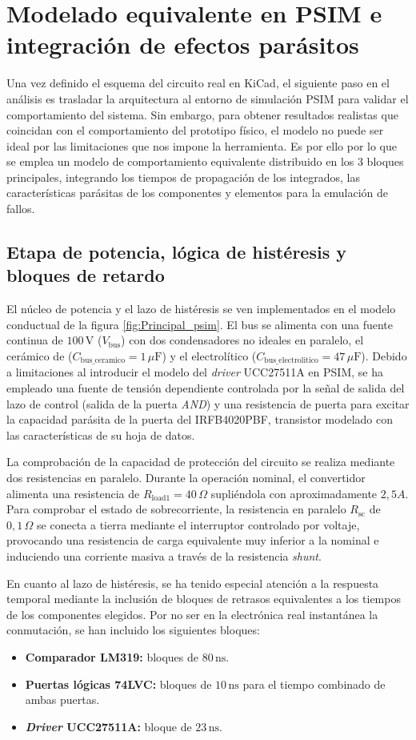 \documentclass[12pt]{report} %
\begin{document}
\section{Modelado equivalente en PSIM e integración de efectos parásitos}
Una vez definido el esquema del circuito real en KiCad, el siguiente paso en el análisis es trasladar la arquitectura al entorno de simulación PSIM para validar el comportamiento del sistema. Sin embargo, para obtener resultados realistas que coincidan con el comportamiento del prototipo físico, el modelo no puede ser ideal por las limitaciones que nos impone la herramienta. Es por ello por lo que se emplea un modelo de comportamiento equivalente distribuido en los 3 bloques principales, integrando los tiempos de propagación de los integrados, las características parásitas de los componentes y elementos para la emulación de fallos. 

\subsection{Etapa de potencia, lógica de histéresis y bloques de retardo}
El núcleo de potencia y el lazo de histéresis se ven implementados en el modelo conductual de la figura \ref{fig:Principal_psim}. El bus se alimenta con una fuente continua de $100\,\text{V}$ ($V_\text{bus}$) con dos condensadores no ideales en paralelo, el cerámico de ($C_\text{bus\_ceramico} = 1\,\mu\text{F}$) y el electrolítico ($C_\text{bus\_electrolitico} = 47\,\mu\text{F}$). Debido a limitaciones al introducir el modelo del \textit{driver} UCC27511A en PSIM, se ha empleado una fuente de tensión dependiente controlada por la señal de salida del lazo de control (salida de la puerta \textit{AND}) y una resistencia de puerta para excitar la capacidad parásita de la puerta del IRFB4020PBF, transistor modelado con las características de su hoja de datos. 

La comprobación de la capacidad de protección del circuito se realiza mediante dos resistencias en paralelo. Durante la operación nominal, el convertidor alimenta una resistencia de $R_\text{load1} = 40\,\Omega$ supliéndola con aproximadamente $2{,}5 A$. Para comprobar el estado de sobrecorriente, la resistencia en paralelo $R_\text{sc}$ de $0{,}1\,\Omega$ se conecta a tierra mediante el interruptor controlado por voltaje, provocando una resistencia de carga equivalente muy inferior a la nominal e induciendo una corriente masiva a través de la resistencia \textit{shunt}.

En cuanto al lazo de histéresis, se ha tenido especial atención a la respuesta temporal mediante la inclusión de bloques de retrasos equivalentes a los tiempos de los componentes elegidos. Por no ser en la electrónica real instantánea la conmutación, se han incluido los siguientes bloques: 
\begin{itemize}
    \item \textbf{Comparador LM319:} bloques de $80\,\text{ns}$. 
    \item \textbf{Puertas lógicas 74LVC:} bloques de $10\,\text{ns}$ para el tiempo combinado de ambas puertas.
    \item \textbf{\textit{Driver} UCC27511A:} bloque de $23\,\text{ns}$.
\end{itemize}
\end{document}
